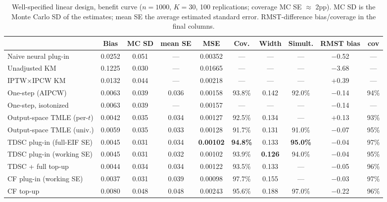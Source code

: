 \documentclass[11pt]{article}
\theoremstyle{remark}
\begin{document}
\begin{table}[t]
\centering\footnotesize
\setlength{\tabcolsep}{3.6pt}
\caption{Well-specified linear design, benefit curve ($n=1000$, $K=30$, 100 replications; coverage MC SE $\approx$ 2pp). MC SD is the Monte Carlo SD of the estimates; mean SE the average estimated standard error. RMST-difference bias/coverage in the final columns.}
\label{tab:main}
\begin{tabular}{lccccccc|cc}
\toprule
 & Bias & MC SD & mean SE & MSE & Cov. & Width & Simult. & RMST bias & cov \\
\midrule
Naive neural plug-in & 0.0252 & 0.051 & --- & 0.00352 & --- & --- & --- & $-$0.52 & --- \\
Unadjusted KM        & 0.1225 & 0.030 & --- & 0.01665 & --- & --- & --- & $-$3.68 & --- \\
IPTW$\times$IPCW KM  & 0.0132 & 0.044 & --- & 0.00218 & --- & --- & --- & $+$0.39 & --- \\
One-step (AIPCW)     & 0.0063 & 0.039 & 0.036 & 0.00158 & 93.8\% & 0.142 & 92.0\% & $-$0.14 & 94\% \\
One-step, isotonized & 0.0063 & 0.039 & --- & 0.00157 & --- & --- & --- & $-$0.14 & --- \\
Output-space TMLE (per-$t$) & 0.0042 & 0.035 & 0.034 & 0.00127 & 92.5\% & 0.134 & --- & $+$0.13 & 93\% \\
Output-space TMLE (univ.) & 0.0059 & 0.035 & 0.033 & 0.00128 & 91.7\% & 0.131 & 91.0\% & $-$0.07 & 95\% \\
TDSC plug-in (full-EIF SE) & 0.0045 & 0.031 & 0.034 & \textbf{0.00102} & \textbf{94.8\%} & 0.133 & \textbf{95.0\%} & $-$0.04 & 97\% \\
TDSC plug-in (working SE)  & 0.0045 & 0.031 & 0.032 & 0.00102 & 93.9\% & \textbf{0.126} & 94.0\% & $-$0.04 & 95\% \\
TDSC + full top-up   & 0.0044 & 0.034 & 0.034 & 0.00122 & 93.5\% & 0.133 & --- & $-$0.05 & 96\% \\
CF plug-in (working SE) & 0.0037 & 0.031 & 0.039 & 0.00098 & 97.7\% & 0.155 & --- & $-$0.03 & 97\% \\
CF top-up            & 0.0080 & 0.048 & 0.048 & 0.00243 & 95.6\% & 0.188 & 97.0\% & $-$0.22 & 96\% \\
\bottomrule
\end{tabular}
\end{table}
\end{document}
